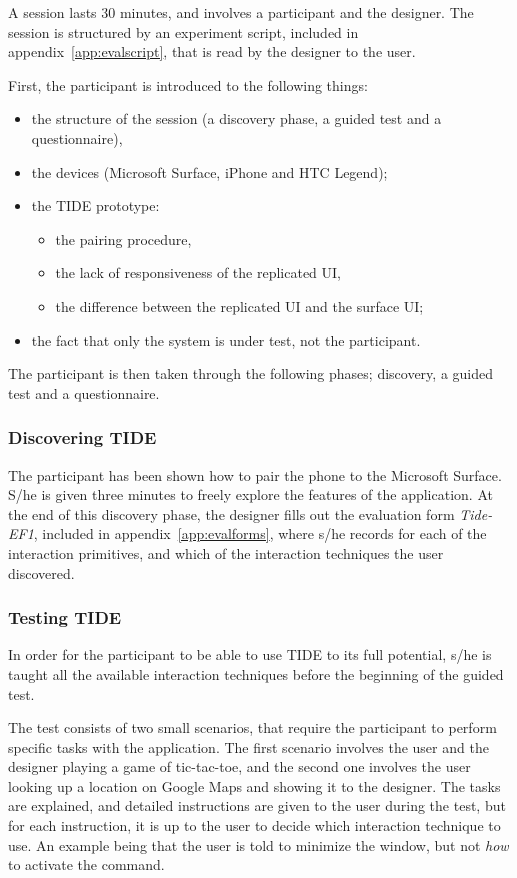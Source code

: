 A session lasts 30 minutes, and involves a participant and the designer.
The session is structured by an experiment script, included in appendix~\ref{app:evalscript}, that is read by the designer to the user.

First, the participant is introduced to the following things:
\begin{itemize}
\item the structure of the session (a discovery phase, a guided test and a questionnaire),
\item the devices (Microsoft Surface, iPhone and HTC Legend);
\item the TIDE prototype:
	\begin{itemize}
	\item the pairing procedure,
	\item the lack of responsiveness of the replicated UI,
	\item the difference between the replicated UI and the surface UI;
	\end{itemize}
\item the fact that only the system is under test, not the participant.
\end{itemize}

The participant is then taken through the following phases; discovery, a guided test and a questionnaire.

\subsubsection{Discovering TIDE}

The participant has been shown how to pair the phone to the Microsoft Surface.
S/he is given three minutes to freely explore the features of the application.
At the end of this discovery phase, the designer fills out the evaluation form \emph{Tide-EF1}, included in appendix~\ref{app:evalforms}, where s/he records for each of the interaction primitives, and which of the interaction techniques the user discovered.

\subsubsection{Testing TIDE}

In order for the participant to be able to use TIDE to its full potential, s/he is taught all the available interaction techniques before the beginning of the guided test.

The test consists of two small scenarios, that require the participant to perform specific tasks with the application.
The first scenario involves the user and the designer playing a game of tic-tac-toe, and the second one involves the user looking up a location on Google Maps and showing it to the designer.
The tasks are explained, and detailed instructions are given to the user during the test, but for each instruction, it is up to the user to decide which interaction technique to use.
An example being that the user is told to minimize the window, but not \emph{how} to activate the command.

